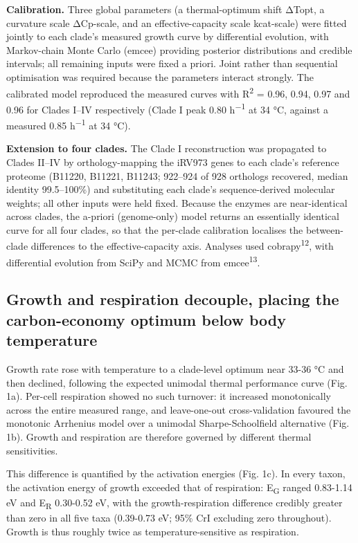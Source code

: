 \documentclass[
]{article}
\begin{document}
\textbf{Calibration.} Three global parameters (a thermal-optimum shift
ΔTopt, a curvature scale ΔCp-scale, and an effective-capacity scale
kcat-scale) were fitted jointly to each clade's measured growth curve by
differential evolution, with Markov-chain Monte Carlo (emcee) providing
posterior distributions and credible intervals; all remaining inputs
were fixed a priori. Joint rather than sequential optimisation was
required because the parameters interact strongly. The calibrated model
reproduced the measured curves with R\textsuperscript{2} = 0.96, 0.94,
0.97 and 0.96 for Clades I--IV respectively (Clade I peak 0.80
h\textsuperscript{−1} at 34 °C, against a measured 0.85
h\textsuperscript{−1} at 34 °C).

\textbf{Extension to four clades.} The Clade I reconstruction was
propagated to Clades II--IV by orthology-mapping the iRV973 genes to
each clade's reference proteome (B11220, B11221, B11243; 922--924 of 928
orthologs recovered, median identity 99.5--100\%) and substituting each
clade's sequence-derived molecular weights; all other inputs were held
fixed. Because the enzymes are near-identical across clades, the
a-priori (genome-only) model returns an essentially identical curve for
all four clades, so that the per-clade calibration localises the
between-clade differences to the effective-capacity axis. Analyses used
cobrapy\textsuperscript{12}, with differential evolution from SciPy and
MCMC from emcee\textsuperscript{13}.

\subsection{Growth and respiration decouple, placing the carbon-economy
optimum below body
temperature}\label{growth-and-respiration-decouple-placing-the-carbon-economy-optimum-below-body-temperature}

Growth rate rose with temperature to a clade-level optimum near 33-36 °C
and then declined, following the expected unimodal thermal performance
curve (Fig. 1a). Per-cell respiration showed no such turnover: it
increased monotonically across the entire measured range, and
leave-one-out cross-validation favoured the monotonic Arrhenius model
over a unimodal Sharpe-Schoolfield alternative (Fig. 1b). Growth and
respiration are therefore governed by different thermal sensitivities.

This difference is quantified by the activation energies (Fig. 1c). In
every taxon, the activation energy of growth exceeded that of
respiration: E\textsubscript{G} ranged 0.83-1.14 eV and
E\textsubscript{R} 0.30-0.52 eV, with the growth-respiration difference
credibly greater than zero in all five taxa (0.39-0.73 eV; 95\% CrI
excluding zero throughout). Growth is thus roughly twice as
temperature-sensitive as respiration.
\end{document}
